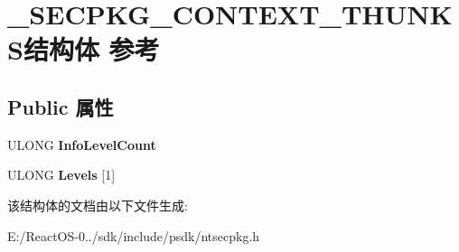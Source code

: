\hypertarget{struct___s_e_c_p_k_g___c_o_n_t_e_x_t___t_h_u_n_k_s}{}\section{\+\_\+\+S\+E\+C\+P\+K\+G\+\_\+\+C\+O\+N\+T\+E\+X\+T\+\_\+\+T\+H\+U\+N\+K\+S结构体 参考}
\label{struct___s_e_c_p_k_g___c_o_n_t_e_x_t___t_h_u_n_k_s}
\subsection*{Public 属性}
\begin{DoxyCompactItemize}
\item 
\mbox{\label{struct___s_e_c_p_k_g___c_o_n_t_e_x_t___t_h_u_n_k_s_a4dd37839064e83bc7459160e62f4c32b}} 
U\+L\+O\+NG {\bfseries Info\+Level\+Count}
\item 
\mbox{\label{struct___s_e_c_p_k_g___c_o_n_t_e_x_t___t_h_u_n_k_s_a288bf4ed759519baf261a38cdafbf31b}} 
U\+L\+O\+NG {\bfseries Levels} \mbox{[}1\mbox{]}
\end{DoxyCompactItemize}


该结构体的文档由以下文件生成\+:\begin{DoxyCompactItemize}
\item 
E\+:/\+React\+O\+S-\/0../sdk/include/psdk/ntsecpkg.\+h\end{DoxyCompactItemize}
